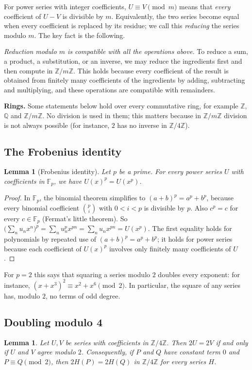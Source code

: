 \documentclass[11pt,a4paper]{article}
\newtheorem{lemma}[theorem]{Lemma}
\theoremstyle{definition}
\theoremstyle{remark}
\newcommand{\Z}{\mathbb{Z}}
\newcommand{\Q}{\mathbb{Q}}
\newcommand{\F}{\mathbb{F}}
\newcommand{\para}[1]{\par\medskip\noindent\textbf{#1}\enspace}
\begin{document}
For power series with integer coefficients, $U\equiv V\pmod m$ means that \emph{every} coefficient of $U-V$ is
divisible by $m$. Equivalently, the two series become equal when every coefficient is replaced by its residue; we call
this \emph{reducing} the series modulo $m$. The key fact is the following.

\emph{Reduction modulo $m$ is compatible with all the operations above.} To reduce a sum, a product, a substitution, or
an inverse, we may reduce the ingredients first and then compute in $\Z/m\Z$. This holds because every
coefficient of the result is obtained from finitely many coefficients of the ingredients by adding, subtracting and
multiplying, and these operations are compatible with remainders.

\para{Rings.} Some statements below hold over every commutative ring, for example $\Z$, $\Q$ and $\Z/m\Z$. No
division is used in them; this matters because in $\Z/m\Z$ division is not always possible (for instance, $2$ has no inverse in
$\Z/4\Z$).

\subsection{The Frobenius identity}
\begin{lemma}[Frobenius identity]\label{lem:frobenius}
Let $p$ be a prime. For every power series $U$ with coefficients in $\F_p$, we have $U(x)^p=U(x^p)$.
\end{lemma}

\begin{proof}
In $\F_p$, the binomial theorem simplifies to $(a+b)^p=a^p+b^p$, because every binomial coefficient
$\binom pi$ with $0<i<p$ is divisible by $p$. Also $c^p=c$ for every $c\in\F_p$ (Fermat's little theorem). So
$\bigl(\sum_nu_nx^n\bigr)^p=\sum_nu_n^px^{pn}=\sum_nu_nx^{pn}=U(x^p)$. The first equality holds for polynomials by
repeated use of $(a+b)^p=a^p+b^p$; it holds for power series because each coefficient of $U(x)^p$ involves only finitely
many coefficients of $U$.
\end{proof}

For $p=2$ this says that squaring a series modulo $2$ doubles every exponent: for instance,
$(x+x^3)^2\equiv x^2+x^6\pmod2$. In particular, the square of any series has, modulo $2$, no terms of odd degree.

\subsection{Doubling modulo 4}
\begin{lemma}\label{lem:double}
Let $U,V$ be series with coefficients in $\Z/4\Z$. Then $2U=2V$ if and only if $U$ and $V$ agree modulo $2$.
Consequently, if $P$ and $Q$ have constant term $0$ and $P\equiv Q\pmod 2$, then $2H(P)=2H(Q)$ in $\Z/4\Z$ for every
series $H$.
\end{lemma}
\end{document}

